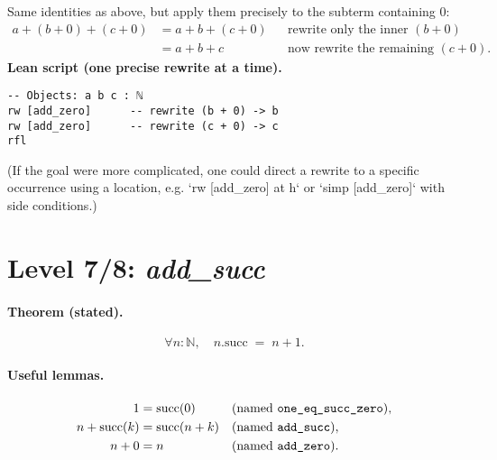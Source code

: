 \documentclass{article}
\theoremstyle{theorem}
\theoremstyle{definition}
\theoremstyle{remark}
\begin{document}
\begin{solution}
Same identities as above, but apply them precisely to the subterm containing \(0\):
\[
\begin{aligned}
a + (b + 0) + (c + 0)
&= a + b + (c + 0) &&\text{rewrite only the inner }(b+0)\\
&= a + b + c       &&\text{now rewrite the remaining }(c+0).
\end{aligned}
\]
\medskip
\noindent\textbf{Lean script (one precise rewrite at a time).}
\begin{lstlisting}
-- Objects: a b c : ℕ
rw [add_zero]      -- rewrite (b + 0) -> b
rw [add_zero]      -- rewrite (c + 0) -> c
rfl
\end{lstlisting}
(If the goal were more complicated, one could direct a rewrite to a specific occurrence using a location, e.g. `rw [add_zero] at h` or `simp [add_zero]` with side conditions.)
\end{solution}

\bigskip

\section*{Level 7/8: \textit{add\_succ}}

\paragraph{Theorem (stated).}
\[
\forall n:\mathbb{N},\quad n.\mathrm{succ} \;=\; n + 1.
\]

\paragraph{Useful lemmas.}
\[
\begin{aligned}
1 &= \mathrm{succ}(0) &&\text{(named \texttt{one\_eq\_succ\_zero})},\\
n + \mathrm{succ}(k) &= \mathrm{succ}(n + k) &&\text{(named \texttt{add\_succ})},\\
n + 0 &= n &&\text{(named \texttt{add\_zero}).}
\end{aligned}
\]
\end{document}
